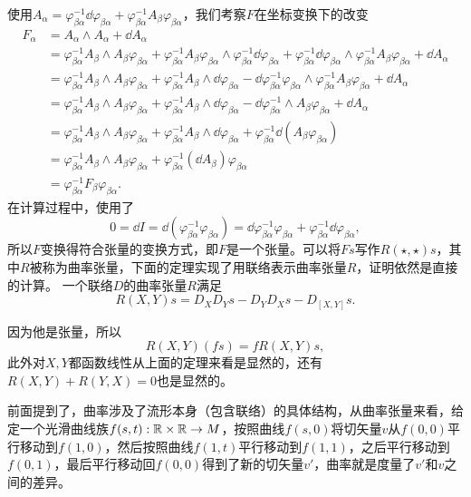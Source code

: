 使用$A_\alpha=\varphi_{\beta\alpha}^{-1}\dd\varphi_{\beta\alpha}+\varphi_{\beta\alpha}^{-1}A_\beta \varphi_{\beta\alpha}$，我们考察$F$在坐标变换下的改变
\begin{align*}
	F_\alpha&=A_\alpha\wedge A_\alpha+\dd A_\alpha\\
	&=\varphi_{\beta\alpha}^{-1}A_\beta \wedge A_\beta \varphi_{\beta\alpha}+ \varphi_{\beta\alpha}^{-1}A_\beta \varphi_{\beta\alpha}\wedge \varphi_{\beta\alpha}^{-1}\dd\varphi_{\beta\alpha}+\varphi_{\beta\alpha}^{-1}\dd\varphi_{\beta\alpha}\wedge \varphi_{\beta\alpha}^{-1}A_\beta \varphi_{\beta\alpha}+\dd A_\alpha\\
	&=\varphi_{\beta\alpha}^{-1}A_\beta \wedge A_\beta \varphi_{\beta\alpha}+ \varphi_{\beta\alpha}^{-1}A_\beta \wedge \dd\varphi_{\beta\alpha}-\dd\varphi_{\beta\alpha}^{-1}\varphi_{\beta\alpha}\wedge \varphi_{\beta\alpha}^{-1}A_\beta \varphi_{\beta\alpha}+\dd A_\alpha\\
	&=\varphi_{\beta\alpha}^{-1}A_\beta \wedge A_\beta \varphi_{\beta\alpha}+ \varphi_{\beta\alpha}^{-1}A_\beta \wedge \dd\varphi_{\beta\alpha}-\dd\varphi_{\beta\alpha}^{-1}\wedge A_\beta \varphi_{\beta\alpha}+\dd A_\alpha\\
	&=\varphi_{\beta\alpha}^{-1}A_\beta \wedge A_\beta \varphi_{\beta\alpha}+ \varphi_{\beta\alpha}^{-1}A_\beta \wedge \dd\varphi_{\beta\alpha}+\varphi_{\beta\alpha}^{-1}\dd \left(A_\beta \varphi_{\beta\alpha}\right)\\
	&=\varphi_{\beta\alpha}^{-1}A_\beta \wedge A_\beta \varphi_{\beta\alpha}+\varphi_{\beta\alpha}^{-1}(\dd A_\beta)\varphi_{\beta\alpha}\\
	&=\varphi_{\beta\alpha}^{-1}F_\beta \varphi_{\beta\alpha}.
\end{align*}
在计算过程中，使用了
\[
	0=\dd I=\dd (\varphi_{\beta\alpha}^{-1}\varphi_{\beta\alpha})=\dd \varphi_{\beta\alpha}^{-1}\varphi_{\beta\alpha}+\varphi_{\beta\alpha}^{-1}\dd\varphi_{\beta\alpha},
\]
所以$F$变换得符合张量的变换方式，即$F$是一个张量。可以将$Fs$写作$R(\star,\star)s$，其中$R$被称为曲率张量，下面的定理实现了用联络表示曲率张量$R$，证明依然是直接的计算。
\para 一个联络$D$的曲率张量$R$满足
	\[
		R(X,Y)s=D_XD_Ys-D_YD_Xs-D_{[X,Y]}s.
	\]

因为他是张量，所以
\[
	R(X,Y)(fs)=fR(X,Y)s,
\]
此外对$X,Y$都函数线性从上面的定理来看是显然的，还有$R(X,Y)+R(Y,X)=0$也是显然的。

前面提到了，曲率涉及了流形本身（包含联络）的具体结构，从曲率张量来看，给定一个光滑曲线族$f(s,t):\mathbb{R}\times \mathbb{R}\to M$，按照曲线$f(s,0)$将切矢量$v$从$f(0,0)$平行移动到$f(1,0)$，然后按照曲线$f(1,t)$平行移动到$f(1,1)$，之后平行移动到$f(0,1)$，最后平行移动回$f(0,0)$得到了新的切矢量$v'$，曲率就是度量了$v'$和$v$之间的差异。

